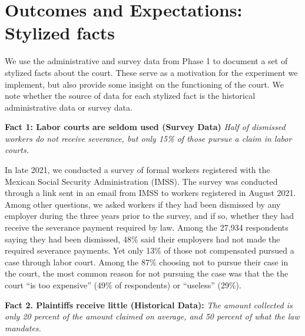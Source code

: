 \documentclass[11pt, a4paper]{article}
\begin{document}
\section{Outcomes and Expectations: Stylized facts} \label{FactsSection}

We use the administrative and survey data from Phase 1 to document a set of stylized facts about the court. These serve as a motivation for the experiment we implement, but also provide some insight on the functioning of the court. We note whether the source of data for each stylized fact is the historical administrative data or survey data.

\vspace{.15in}

\textbf{Fact 1: Labor courts are seldom used (Survey Data)} \emph{Half of dismissed workers do not receive severance, but only 15\% of those pursue a claim in labor courts.}

In late 2021, we conducted a survey of formal workers registered with the Mexican Social Security Administration (IMSS). The survey was conducted through a link sent in an email from IMSS to workers registered in August 2021. Among other questions, we asked workers if they had been dismissed by any employer during the three years prior to the survey, and if so, whether they had receive the severance payment required by law. Among the 27,934 respondents saying they had been dismissed, 48\% said their employers had not made the required severance payments. Yet only 13\% of those not compensated pursued a case through labor court. Among the 87\% choosing not to pursue their case in the court, the most common reason for not pursuing the case was that the the court “is too expensive” (49\% of respondents) or “useless” (29\%). 

\vspace{.15in}

\textbf{Fact 2. Plaintiffs receive little (Historical Data):} \emph{The amount collected is only 20 percent of the amount claimed on average, and 50 percent of what the law mandates.}
\vspace{.07in}
\end{document}

